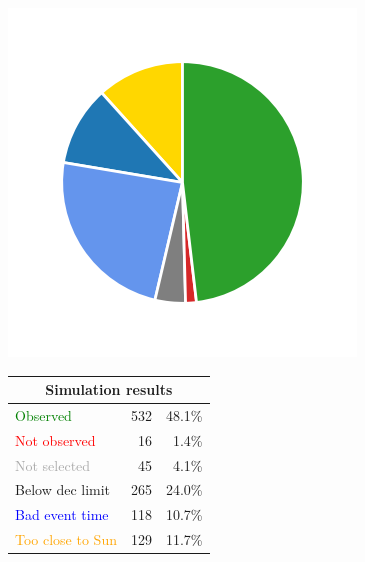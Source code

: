 \begin{colsection}
\begin{colsection}
\begin{figure}[p]
    \begin{center}
        \begin{minipage}[t]{0.2\textwidth}\vspace{10pt}
            \includegraphics[width=\linewidth]{images/gw_sims/1n4_pie.png}
        \end{minipage}
        \begin{minipage}[t]{0.37\textwidth}\vspace{0pt}
            \begin{tabular}{lrr}
                \multicolumn{3}{c}{\textbf{Simulation results}} \\
                \midrule
                \textcolor{Green}{Observed} & 532 & 48.1\% \\
                \textcolor{Red}{Not observed} & 16 & 1.4\% \\
                \textcolor{darkgray}{Not selected} & 45 & 4.1\% \\
                \textcolor{NavyBlue}{Below dec limit} & 265 & 24.0\% \\
                \textcolor{Blue}{Bad event time} & 118 & 10.7\% \\
                \textcolor{Orange}{Too close to Sun} & 129 & 11.7\% \\

\end{tabular}
\end{minipage}
\end{center}
\end{figure}
\end{colsection}
\end{colsection}
